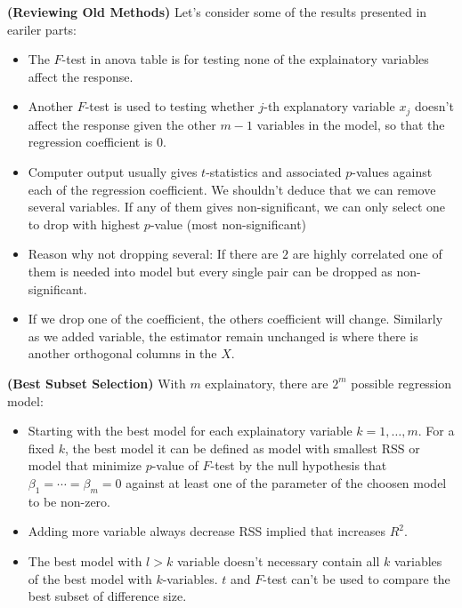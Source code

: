 \begin{remark}{\textbf{(Reviewing Old Methods)}}
    Let's consider some of the results presented in eariler parts:
    \begin{itemize}
        \item The $F$-test in anova table is for testing none of the explainatory variables affect the response. 
        \item Another $F$-test is used to testing whether $j$-th explanatory variable $x_j$ doesn't affect the response given the other $m-1$ variables in the model, so that the regression coefficient is $0$. 
        \item Computer output usually gives $t$-statistics and associated $p$-values against each of the regression coefficient. We shouldn't deduce that we can remove several variables. If any of them gives non-significant, we can only select one to drop with highest $p$-value (most non-significant)
        \item Reason why not dropping several: If there are $2$ are highly correlated one of them is needed into model but every single pair can be dropped as non-significant. 
        \item If we drop one of the coefficient, the others coefficient will change. Similarly as we added variable, the estimator remain unchanged is where there is another orthogonal columns in the $X$.
    \end{itemize}
\end{remark}

\begin{remark}{\textbf{(Best Subset Selection)}}
    With $m$ explainatory, there are $2^m$ possible regression model:
    \begin{itemize}
        \item Starting with the best model for each explainatory variable $k=1,\dots,m$. For a fixed $k$, the best model it can be defined as model with smallest RSS or model that minimize $p$-value of $F$-test by the null hypothesis that $\beta_1=\cdots=\beta_m=0$ against at least one of the parameter of the choosen model to be non-zero. 
        \item Adding more variable always decrease RSS implied that increases $R^2$.
        \item The best model with $l>k$ variable doesn't necessary contain all $k$ variables of the best model with $k$-variables. $t$ and $F$-test can't be used to compare the best subset of difference size. 
    \end{itemize}
\end{remark}

